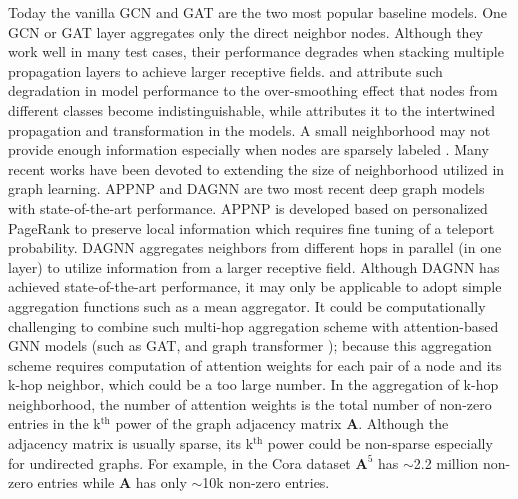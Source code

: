 \documentclass[lettersize,journal]{IEEEtran}
\theoremstyle{plain}
\theoremstyle{definition}
\theoremstyle{remark}
\begin{document}
Today the vanilla GCN and GAT are the two most popular baseline models. One GCN or GAT layer aggregates only the direct neighbor nodes. Although they work well in many test cases, their performance degrades when stacking multiple propagation layers to achieve larger receptive fields. \cite{xu2018representation} and \cite{li2018deeper} attribute such degradation in model performance to the over-smoothing effect that nodes from different classes become indistinguishable, while \cite{liu2020towards} attributes it to the intertwined propagation and transformation in the models. A small neighborhood may not provide enough information especially when nodes are sparsely labeled \cite{klicpera2018predict, liu2020towards}. Many recent works have been devoted to extending the size of neighborhood utilized in graph learning. APPNP \cite{klicpera2018predict} and DAGNN \cite{liu2020towards} are two most recent deep graph models with state-of-the-art performance. APPNP \cite{klicpera2018predict} is developed based on personalized PageRank to preserve local information which requires fine tuning of a teleport probability. DAGNN \cite{liu2020towards} aggregates neighbors from different hops in parallel (in one layer) to utilize information from a larger receptive field. Although DAGNN has achieved state-of-the-art performance, it may only be applicable to adopt simple aggregation functions such as a mean aggregator. It could be computationally challenging to combine such multi-hop aggregation scheme with attention-based GNN models (such as GAT, and graph transformer \cite{dwivedi2020generalization, hu2020heterogeneous}); because this aggregation scheme requires computation of attention weights for each pair of a node and its k-hop neighbor, which could be a too large number. In the aggregation of k-hop neighborhood, the number of attention weights is the total number of non-zero entries in the k$^{\text{th}}$ power of the graph adjacency matrix $\bm{A}$. Although the adjacency matrix is usually sparse, its k$^{\text{th}}$ power could be non-sparse especially for undirected graphs. For example, in the Cora dataset \cite{wang2019dgl} $\bm{A}^5$ has $\sim$2.2 million non-zero entries while $\bm{A}$ has only $\sim$10k non-zero entries. 
\end{document}
